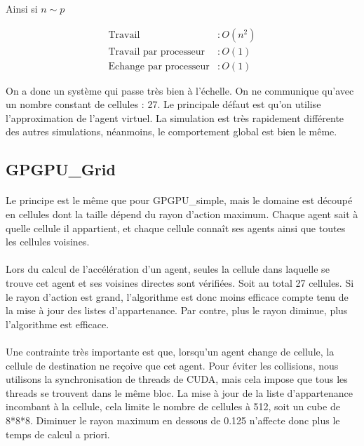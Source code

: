 \documentclass[liens,entete-ensimag,margeCorrection]{ensirapport}
\begin{document}
Ainsi si $n \sim p$

\begin{align*}
    \text{Travail} &: O\left( n^2 \right) \\
    \text{Travail par processeur} &: O\left( 1 \right)  \\
    \text{Echange par processeur} &: O\left( 1 \right)
\end{align*}

On a donc un système qui passe très bien à l'échelle. On ne communique qu'avec un nombre constant de cellules : 27.
Le principale défaut est qu'on utilise l'approximation de l'agent virtuel.
La simulation est très rapidement différente des autres simulations, néanmoins, le comportement global est bien le même.

\subsection{GPGPU\_Grid}
\paragraph{}
Le principe est le même que pour GPGPU\_simple, mais le domaine est découpé en cellules dont la taille dépend du rayon d'action maximum. Chaque agent sait à quelle cellule il appartient, et chaque cellule connaît ses agents ainsi que toutes les cellules voisines.
\paragraph{}
Lors du calcul de l'accélération d'un agent, seules la cellule dans laquelle se trouve cet agent et ses voisines directes sont vérifiées. Soit au total 27 cellules. Si le rayon d'action est grand, l'algorithme est donc moins efficace compte tenu de la mise à jour des listes d'appartenance. Par contre, plus le rayon diminue, plus l'algorithme est efficace. 
\paragraph{}
Une contrainte très importante est que, lorsqu'un agent change de cellule, la cellule de destination ne reçoive que cet agent. Pour éviter les collisions, nous utilisons la synchronisation de threads de CUDA, mais cela impose que tous les threads se trouvent dans le même bloc. La mise à jour de la liste d'appartenance incombant à la cellule, cela limite le nombre de cellules à 512, soit un cube de 8*8*8. Diminuer le rayon maximum en dessous de 0.125 n'affecte donc plus le temps de calcul a priori.
\end{document}
